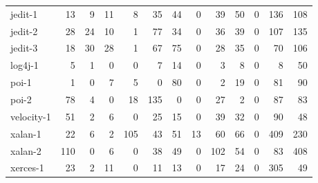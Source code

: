 \begin{figure}[!htbp]
{{\begin{tabular}{@{}l|rrr|rrr|rrr|rrr}
jedit-1    & \cellcolor{gr1}13    & 9     & 11       & 8     & 35    & \cellcolor{gr2}44       & 0     & 39    & \cellcolor{gr3}50       & 0     & \cellcolor{gr4}136   & 108      \bigstrut\\

jedit-2    & \cellcolor{gr1}28    & 24    & 10       & 1     & \cellcolor{gr2}77    & 34       & 0     & 36    & \cellcolor{gr3}39       & 0     & 107   &\cellcolor{gr4} 135      \bigstrut\\

jedit-3    & 18    & \cellcolor{gr1}30    & 28       & 1     & 67    & \cellcolor{gr2}75       & 0     & 28    & \cellcolor{gr3}35       & 0     & 70    & \cellcolor{gr4}106      \bigstrut\\ \hline

log4j-1    & \cellcolor{gr1}5     & 1     & 0        & 0     & 7     & \cellcolor{gr2}14       & 0     & 3     & \cellcolor{gr3}8        & 0     & 8     & \cellcolor{gr4}50       \bigstrut\\ \hline

poi-1      & 1     & 0     & \cellcolor{gr1}7        & 5     & 0     & \cellcolor{gr2}80       & 0     & 2     & \cellcolor{gr3}19       & 0     & 81    & \cellcolor{gr4}90       \bigstrut\\

poi-2      & \cellcolor{gr1}78    & 4     & 0        & 18    & \cellcolor{gr2}135   & 0        & 0     & \cellcolor{gr3}27    & 2        & 0     & \cellcolor{gr4}87    & 83       \bigstrut\\ \hline

velocity-1 & \cellcolor{gr1}51    & 2     & 6        & 0     & \cellcolor{gr2}25    & 15       & 0     & \cellcolor{gr3}39    & 32       & 0     & \cellcolor{gr4}90    & 48       \bigstrut\\ \hline

xalan-1    & \cellcolor{gr1}22    & 6     & 2        & \cellcolor{gr2}105   & 43    & 51       & 13    & 60    & \cellcolor{gr3}66       & 0     & \cellcolor{gr4}409   & 230      \bigstrut\\

xalan-2    & \cellcolor{gr1}110   & 0     & 6        & 0     & 38    & \cellcolor{gr2}49       & 0     & \cellcolor{gr3}102   & 54       & 0     & 83    & \cellcolor{gr4}408      \bigstrut\\ \hline

xerces-1   & \cellcolor{gr1}23    & 2     & 11       & 0     & 11    & \cellcolor{gr2}13       & 0     & 17    & \cellcolor{gr3}24       & 0     & \cellcolor{gr4}305   & 49       \bigstrut\\


\end{tabular}}}
\end{figure}
